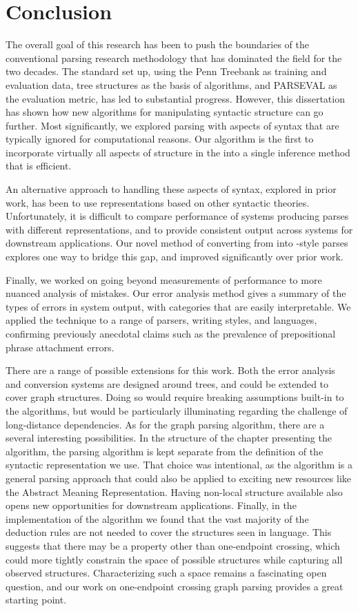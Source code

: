 \chapter{Conclusion}

The overall goal of this research has been to push the boundaries of the conventional parsing research methodology that has dominated the field for the two decades.
The standard set up, using the Penn Treebank as training and evaluation data, tree structures as the basis of algorithms, and PARSEVAL as the evaluation metric, has led to substantial progress.
However, this dissertation has shown how new algorithms for manipulating syntactic structure can go further.
Most significantly, we explored parsing with aspects of syntax that are typically ignored for computational reasons.
Our algorithm is the first to incorporate virtually all aspects of structure in the \ptb into a single inference method that is efficient.

An alternative approach to handling these aspects of syntax, explored in prior work, has been to use representations based on other syntactic theories.
Unfortunately, it is difficult to compare performance of systems producing parses with different representations, and to provide consistent output across systems for downstream applications.
Our novel method of converting from \ccg into \ptb-style parses explores one way to bridge this gap, and improved significantly over prior work.

Finally, we worked on going beyond measurements of performance to more nuanced analysis of mistakes.
Our error analysis method gives a summary of the types of errors in system output, with categories that are easily interpretable.
We applied the technique to a range of parsers, writing styles, and languages, confirming previously anecdotal claims such as the prevalence of prepositional phrase attachment errors.

There are a range of possible extensions for this work.
Both the error analysis and conversion systems are designed around trees, and could be extended to cover graph structures.
Doing so would require breaking assumptions built-in to the algorithms, but would be particularly illuminating regarding the challenge of long-distance dependencies.
As for the graph parsing algorithm, there are a several interesting possibilities.
In the structure of the chapter presenting the algorithm, the parsing algorithm is kept separate from the definition of the syntactic representation we use.
That choice was intentional, as the algorithm is a general parsing approach that could also be applied to exciting new resources like the Abstract Meaning Representation.
Having non-local structure available also opens new opportunities for downstream applications.
Finally, in the implementation of the algorithm we found that the vast majority of the deduction rules are not needed to cover the structures seen in language.
This suggests that there may be a property other than one-endpoint crossing, which could more tightly constrain the space of possible structures while capturing all observed structures.
Characterizing such a space remains a fascinating open question, and our work on one-endpoint crossing graph parsing provides a great starting point.

